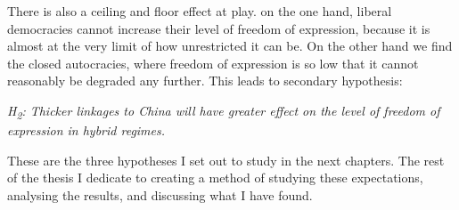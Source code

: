 There is also a ceiling and floor effect at play. on the one hand, liberal democracies cannot increase their level of freedom of expression, because it is almost at the very limit of how unrestricted it can be. On the other hand we find the closed autocracies, where freedom of expression is so low that it cannot reasonably be degraded any further. This leads to secondary hypothesis:
\begin{displayquote}
    \textit{H\textsubscript{2}: Thicker linkages to China will have greater effect on the level of freedom of expression in hybrid regimes.}
\end{displayquote}

These are the three hypotheses I set out to study in the next chapters. The rest of the thesis I dedicate to creating a method of studying these expectations, analysing the results, and discussing what I have found. 